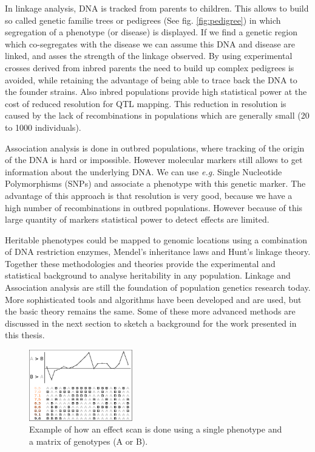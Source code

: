 In linkage analysis, DNA is tracked from parents to children. This allows to build so called 
genetic familie trees or pedigrees (See fig. \ref{fig:pedigree}) in which segregation of a phenotype (or 
disease) is displayed. If we find a genetic region which co-segregates with the disease we can assume this DNA and 
disease are linked, and asses the strength of the linkage observed. By using experimental 
crosses derived from inbred parents the need to build up complex pedigrees is avoided, while 
retaining the advantage of being able to trace back the DNA to the founder strains. Also inbred 
populations provide high statistical power at the cost of reduced resolution for QTL mapping. 
This reduction in resolution is caused by the lack of recombinations in populations which are 
generally small (20 to 1000 individuals).

Association analysis is done in outbred populations, where tracking of the origin of the 
DNA is hard or impossible. However molecular markers still allows to get information 
about the underlying DNA. We can use \emph{e.g.} Single Nucleotide Polymorphisms (SNPs) and associate 
a phenotype with this genetic marker. The advantage of this approach is that resolution is 
very good, because we have a high number of recombinations in outbred populations. However 
because of this large quantity of markers statistical power to detect effects are limited.

Heritable phenotypes could be mapped to genomic locations using a combination of DNA 
restriction enzymes, Mendel's inheritance laws and Hunt's linkage theory. Together these 
methodologies and theories provide the experimental and statistical background to 
analyse heritability in any population. Linkage and Association analysis are still the 
foundation of population genetics research today. More sophisticated tools and algorithms have been 
developed and are used, but the basic theory remains the same. Some of these more 
advanced methods are discussed in the next section to sketch a background for the work 
presented in this thesis.

\begin{figure}[h!]
 \centering
    \includegraphics[width=0.4\textwidth]{eps/image_1_1}
  \caption[Effect scan across the genome.]
    {Example of how an effect scan is done using a single phenotype and a matrix of genotypes (A or B).}
    \label{fig:effectscan}
\end{figure}

